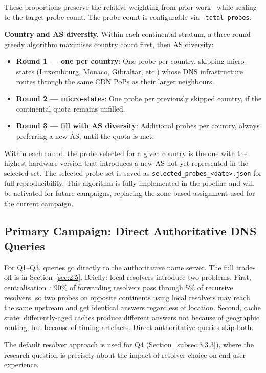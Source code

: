 These proportions preserve the relative weighting from prior work~\cite{Bajpai2017} while scaling to the target probe count. The probe count is configurable via \texttt{--total-probes}.

\textbf{Country and \ac{AS} diversity.} Within each continental stratum, a three-round greedy algorithm maximises country count first, then \ac{AS} diversity:

\begin{itemize}
  \item \textbf{Round 1 --- one per country}: One probe per country, skipping micro-states (Luxembourg, Monaco, Gibraltar, etc.) whose \ac{DNS} infrastructure routes through the same \ac{CDN} \ac{PoP}s as their larger neighbours.
  \item \textbf{Round 2 --- micro-states}: One probe per previously skipped country, if the continental quota remains unfilled.
  \item \textbf{Round 3 --- fill with \ac{AS} diversity}: Additional probes per country, always preferring a new \ac{AS}, until the quota is met.
\end{itemize}

Within each round, the probe selected for a given country is the one with the highest hardware version that introduces a new \ac{AS} not yet represented in the selected set. The selected probe set is saved as \texttt{selected\_probes\_<date>.json} for full reproducibility. This algorithm is fully implemented in the pipeline and will be activated for future campaigns, replacing the zone-based assignment used for the current campaign.

\subsection{Primary Campaign: Direct Authoritative DNS Queries}
\label{subsec:3.3.2}

For Q1--Q3, queries go directly to the authoritative name server. The full trade-off is in Section~\ref{sec:2.5}. Briefly: local resolvers introduce two problems. First, centralisation~\cite{Xu2023}: 90\% of forwarding resolvers pass through 5\% of recursive resolvers, so two probes on opposite continents using local resolvers may reach the same upstream and get identical answers regardless of location. Second, cache state: differently-aged caches produce different answers not because of geographic routing, but because of timing artefacts. Direct authoritative queries skip both.

The default resolver approach is used for Q4 (Section~\ref{subsec:3.3.3}), where the research question is precisely about the impact of resolver choice on end-user experience.

